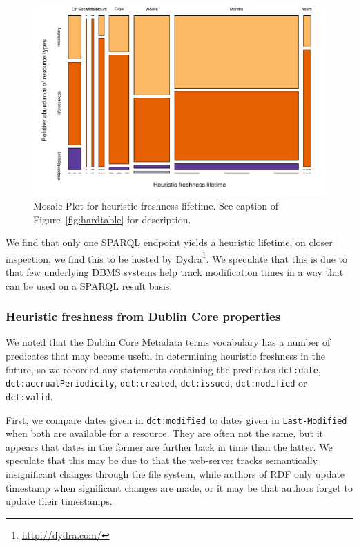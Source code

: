 \documentclass{llncs}
\newcommand{\rdfterm}[1]{\texttt{#1}}
\newcommand{\httph}[1]{\texttt{#1}}
\begin{document}
\begin{figure}[hb!]
  \centerline{%
    \includegraphics[width=.9\textwidth]{heuristictable.pdf}}
  \caption{Mosaic Plot for heuristic freshness lifetime. See caption
    of Figure~\ref{fig:hardtable} for description.  }
  \label{fig:heuristictable}
\end{figure}


We find that only one SPARQL endpoint yields a heuristic lifetime, on
closer inspection, we find this to be hosted by
Dydra\footnote{\url{http://dydra.com/}}. We speculate that this is due to
that few underlying DBMS systems help track modification times in a
way that can be used on a SPARQL result basis.

\subsubsection{Heuristic freshness from Dublin Core properties}

We noted that the Dublin Core Metadata terms vocabulary has a number
of predicates that may become useful in determining heuristic
freshness in the future, so we recorded any statements containing the
predicates \rdfterm{dct:date}, \rdfterm{dct:accrualPeriodicity},
\rdfterm{dct:created}, \rdfterm{dct:issued}, \rdfterm{dct:modified} or
\rdfterm{dct:valid}.

First, we compare dates given in \rdfterm{dct:modified} to dates given
in \httph{Last-Modified} when both are available for a resource. They
are often not the same, but it appears that dates in the former are
further back in time than the latter. We speculate that this may be
due to that the web-server tracks semantically insignificant changes
through the file system, while authors of RDF only update timestamp
when significant changes are made, or it may be that authors forget to
update their timestamps.
\end{document}
